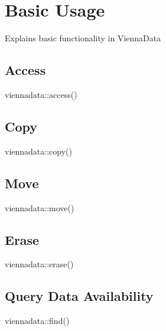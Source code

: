 \chapter{Basic Usage} \label{chap:basic-usage}
Explains basic functionality in ViennaData

\section{Access}
viennadata::access()

\section{Copy}
viennadata::copy()

\section{Move}
viennadata::move()

\section{Erase}
viennadata::erase()

\section{Query Data Availability}
viennadata::find()

